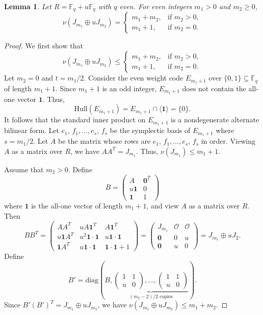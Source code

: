 \documentclass{article}
\newtheorem{lemma}[theorem]{Lemma}
\theoremstyle{definition}
\theoremstyle{remark}
\begin{document}
\begin{lemma}\label{nuzerodiag}
    Let $R=\mathbb{F}_q+u\mathbb{F}_q$ with $q$ even. For even integers $m_1> 0$ and $m_2\ge 0$,
    \[
    \nu(J_{m_1}\oplus uJ_{m_2})=\begin{cases}
        m_1+m_2, & \mbox{if }m_2>0,\\
        m_1+1, & \mbox{if }m_2=0.
    \end{cases}
    \]
\end{lemma}
\begin{proof}
We first show that
\[
\nu(J_{m_1}\oplus uJ_{m_2})\le\begin{cases}
        m_1+m_2, & \mbox{if }m_2>0,\\
        m_1+1, & \mbox{if }m_2=0.
    \end{cases}
\]
Let $m_2=0$ and $t=m_1/2$. Consider the even weight code $E_{m_1+1}$ over $\{0, 1\}\subseteq \mathbb{F}_q$ of length $m_1+1$. Since $m_1+1$ is an odd integer, $E_{m_1+1}$ does not contain the all-one vector $\mathbf{1}$. Thus,
\[
\mathrm{Hull}(E_{m_1+1})=E_{m_1+1}\cap\langle \mathbf{1}\rangle=\{0\}.
\]
It follows that the standard inner product on $E_{m_1+1}$ is a nondegenerate alternate bilinear form. Let $e_1,\, f_1, \ldots, e_s,\, f_s$ be the symplectic basis of $E_{m_1+1}$ where $s=m_1/2$. Let $A$ be the matrix whose rows are $e_1,\, f_1, \ldots, e_s,\, f_s$ in order. Viewing $A$ as a matrix over $R$, we have $AA^T=J_{m_1}$. Thus, $\nu(J_{m_1})\le m_1+1$.

Assume that $m_2>0$. Define
\[
B=\begin{pmatrix}
    A & \mathbf{0}^T\\u\mathbf{1} & 0\\\mathbf{1} & 1
\end{pmatrix}
\]
where $\mathbf{1}$ is the all-one vector of length $m_1+1$, and view $A$ as a matrix over $R$. Then
\[
BB^T=\begin{pmatrix}
    AA^T & uA\mathbf{1}^T & A\mathbf{1}^T\\u\mathbf{1}A^T & u^2\mathbf{1}\cdot\mathbf{1} & u\mathbf{1}\cdot \mathbf{1}\\\mathbf{1}A^T & u\mathbf{1}\cdot \mathbf{1} & \mathbf{1}\cdot \mathbf{1}+1
\end{pmatrix}=
\begin{pmatrix}
    J_{m_1} & \mathcal{O} & \mathcal{O}\\\mathbf{0} & 0 & u\\\mathbf{0} & u & 0
\end{pmatrix}=J_{m_1}\oplus uJ_2.
\]
Define
\[
B'=\mathrm{diag}\left(
B,\underbrace{\begin{pmatrix}
1&1\\
u&0
\end{pmatrix},
\ldots,
\begin{pmatrix}
1&1\\
u&0
\end{pmatrix}
}_{(m_2-2)/2\text{ copies}}
\right).
\]
Since $B'(B')^T=J_{m_1}\oplus uJ_{m_2}$, we have $\nu(J_{m_1}\oplus uJ_{m_2})\le m_1+m_2$.


\end{proof}
\end{document}
